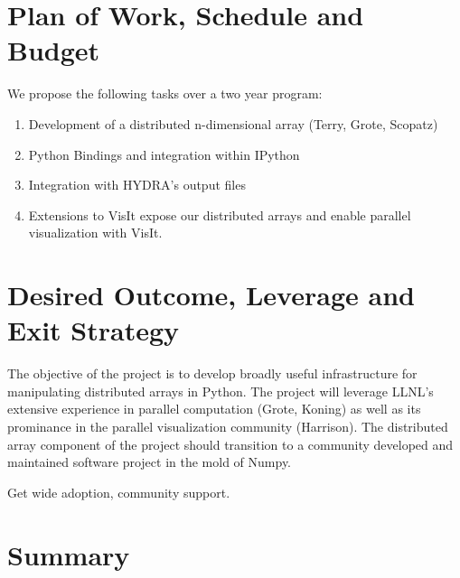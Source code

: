 \documentclass[a4paper]{article}
\begin{document}
\section*{Plan of Work, Schedule and Budget}

We propose the following tasks over a two year program:

\begin{enumerate}
	\item Development of a distributed n-dimensional array (Terry, Grote, Scopatz)

	\item Python Bindings and integration within IPython

	\item Integration with HYDRA's output files

	\item Extensions to VisIt expose our distributed arrays and enable parallel visualization with VisIt.
\end{enumerate}


\section*{Desired Outcome, Leverage and Exit Strategy}

The objective of the project is to develop broadly useful infrastructure for manipulating distributed arrays in Python.  The project will leverage LLNL's extensive experience in parallel computation (Grote, Koning) as well as its prominance in the parallel visualization community (Harrison).   The distributed array component of the project should transition to a community developed and maintained software project in the mold of Numpy.

Get wide adoption, community support.



\section*{Summary}
\end{document}
